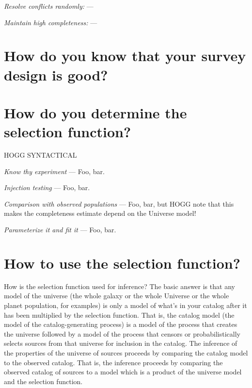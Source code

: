 \documentclass[modern]{aastex62}
\renewcommand{\paragraph}[1]{\medskip\noindent\textit{#1} ---}
\begin{document}
\paragraph{Resolve conflicts randomly:}

\paragraph{Maintain high completeness:}

\section{How do you know that your survey design is good?}\label{sec:verify}

\section{How do you determine the selection function?}\label{sec:estimate}

HOGG SYNTACTICAL

\paragraph{Know thy experiment}
Foo, bar.

\paragraph{Injection testing}
Foo, bar.

\paragraph{Comparison with observed populations}
Foo, bar, but HOGG note that this makes the completeness estimate depend
on the Universe model!

\paragraph{Parameterize it and fit it}
Foo, bar.

\section{How to use the selection function?}\label{sec:howto}

How is the selection function used for inference?
The basic answer is that any model of the universe (the whole galaxy
or the whole Universe or the whole planet population, for examples)
is only a model of what's in your catalog after it has been multiplied
by the selection function.
That is, the catalog model (the model of the catalog-generating process)
is a model of the process that
creates the universe followed by a model of the process that censors or
probabilistically selects sources from that universe for inclusion in the catalog.
The inference of the properties of the universe of sources proceeds
by comparing the catalog model to the observed catalog.
That is, the inference  proceeds by comparing the observed catalog
of sources to a model which is a product of the universe model and the
selection function.
\end{document}
